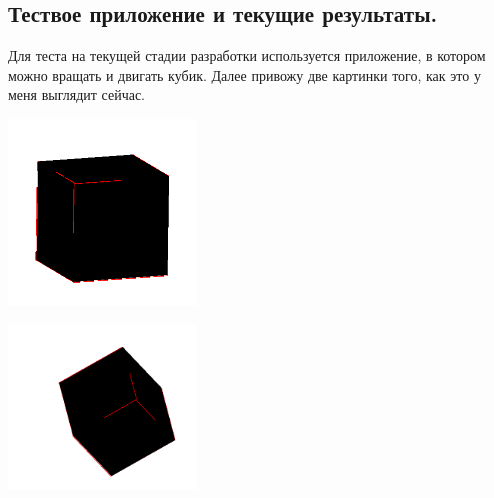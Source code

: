\documentclass{article}
\begin{document}
\newpage
\subsection{Тествое приложение и текущие результаты.}

Для теста на текущей стадии разработки используется приложение, в котором можно вращать и двигать кубик. Далее привожу две картинки того, как это у меня выглядит сейчас.

\begin{center}
\includegraphics[width=5cm]{cube-1.png}

\includegraphics[width=5cm]{cube-2.png}
\end{center}







\end{document}
